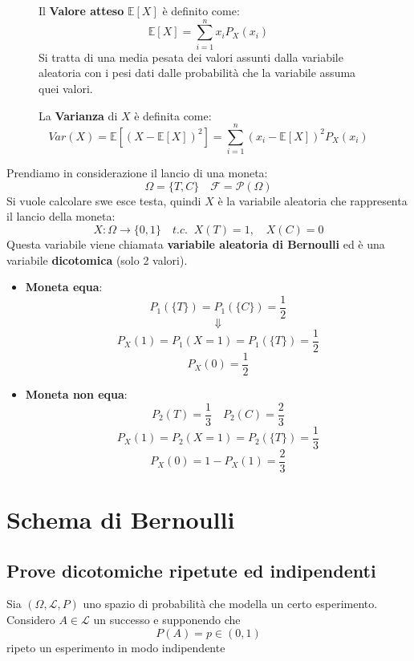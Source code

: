 \documentclass[a4paper]{article}
\theoremstyle{break}
\theoremstyle{break}
\theoremstyle{break}
\theoremstyle{break}
\begin{document}
\begin{figure}[H]
  \begin{definition}
    Il \textbf{Valore atteso} \( \mathbb{E}[X] \) è definito come:
    \[
      \mathbb{E}[X] = \sum_{i=1}^n x_i P_X(x_i)
    \] 
    Si tratta di una media pesata dei valori assunti dalla variabile aleatoria con i
    pesi dati dalle probabilità che la variabile assuma quei valori.
  \end{definition}
\end{figure}

\begin{figure}[H]
  \begin{definition}
    La \textbf{Varianza} di \( X \) è definita come:
    \[
      Var(X) = \mathbb{E}[(X - \mathbb{E}[X])^2] = \sum_{i=1}^n (x_i - \mathbb{E}[X])^2 P_X(x_i)
    \] 
  \end{definition}
\end{figure}

\begin{example}
  Prendiamo in considerazione il lancio di una moneta:
  \[
    \Omega = \{T,C\} \quad \mathcal{F} = \mathcal{P}(\Omega)
  \] 
  Si vuole calcolare swe esce testa, quindi \( X \) è la variabile aleatoria che
  rappresenta il lancio della moneta:
  \[
  X : \Omega \to \{0,1\} \quad t.c.\;\; X(T) = 1, \quad X(C) = 0
  \] 
  Questa variabile viene chiamata \textbf{variabile aleatoria di Bernoulli} ed è una
  variabile \textbf{dicotomica} (solo 2 valori).
  \begin{itemize}
    \item \textbf{Moneta equa}:
      \[
      P_1(\{T\} ) = P_1(\{C\} ) = \frac{1}{2}
      \] 
      \[
      \Downarrow
      \] 
      \[
      P_X(1) = P_1(X=1) = P_1(\{T\} ) = \frac{1}{2}
      \] 
      \[
      P_X(0) = \frac{1}{2}
      \] 
    \item \textbf{Moneta non equa}:
      \[
      P_2(T) = \frac{1}{3} \quad P_2(C) = \frac{2}{3}
      \] 
      \[
      P_X(1) = P_2(X=1) = P_2(\{T\} ) = \frac{1}{3}
      \] 
      \[
      P_X(0) = 1 - P_X(1) = \frac{2}{3}
      \] 
  \end{itemize}
\end{example}

\section{Schema di Bernoulli}
\subsection{Prove dicotomiche ripetute ed indipendenti}
Sia \( (\Omega, \mathcal{L}, P) \) uno spazio di probabilità che modella un certo
esperimento. Considero \( A \in \mathcal{L} \) un successo e supponendo che
\[
P(A) = p \in (0,1)
\] 
ripeto un esperimento in modo indipendente
\end{document}
